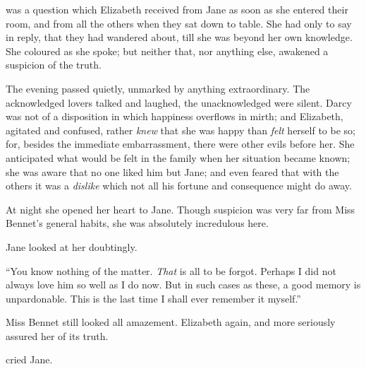  was a question which Elizabeth received from Jane as soon as she entered their room, and from all the others when they sat down to table. She had only to say in reply, that they had wandered about, till she was beyond her own knowledge. She coloured as she spoke; but neither that, nor anything else, awakened a suspicion of the truth.

The evening passed quietly, unmarked by anything extraordinary. The acknowledged lovers talked and laughed, the unacknowledged were silent. Darcy was not of a disposition in which happiness overflows in mirth; and Elizabeth, agitated and confused, rather {\em knew} that she was happy than {\em felt} herself to be so; for, besides the immediate embarrassment, there were other evils before her. She anticipated what would be felt in the family when her situation became known; she was aware that no one liked him but Jane; and even feared that with the others it was a {\em dislike} which not all his fortune and consequence might do away.

At night she opened her heart to Jane. Though suspicion was very far from Miss Bennet's general habits, she was absolutely incredulous here.



Jane looked at her doubtingly. 

“You know nothing of the matter. {\em That} is all to be forgot. Perhaps I did not always love him so well as I do now. But in such cases as these, a good memory is unpardonable. This is the last time I shall ever remember it myself.”

Miss Bennet still looked all amazement. Elizabeth again, and more seriously assured her of its truth.

 cried Jane. 

